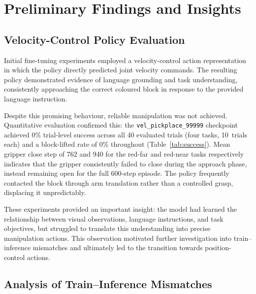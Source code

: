 
\section{Preliminary Findings and Insights}

\subsection{Velocity-Control Policy Evaluation}

Initial fine-tuning experiments employed a velocity-control action representation in which
the policy directly predicted joint velocity commands.
The resulting policy demonstrated evidence of language grounding and task understanding,
consistently approaching the correct coloured block in response to the provided language
instruction.

Despite this promising behaviour, reliable manipulation was not achieved.
Quantitative evaluation confirmed this: the \texttt{vel\_pickplace\_99999} checkpoint
achieved 0\% trial-level success across all 40 evaluated trials
(four tasks, 10~trials each) and a block-lifted rate of 0\% throughout
(Table~\ref{tab:success}).
Mean gripper close step of 762 and 940 for the red-far and red-near tasks respectively
indicates that the gripper consistently failed to close during the approach phase,
instead remaining open for the full 600-step episode.
The policy frequently contacted the block through arm translation rather than a
controlled grasp, displacing it unpredictably.

These experiments provided an important insight: the model had learned the relationship
between visual observations, language instructions, and task objectives, but struggled to
translate this understanding into precise manipulation actions.
This observation motivated further investigation into train--inference mismatches and
ultimately led to the transition towards position-control actions.

\subsection{Analysis of Train--Inference Mismatches}


